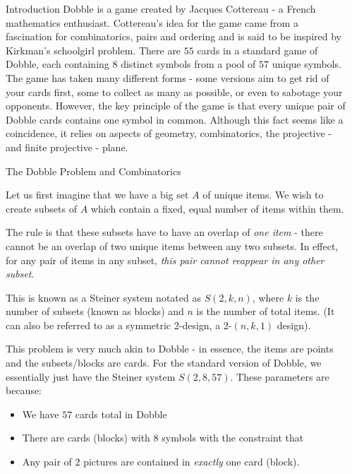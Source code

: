 \documentclass[final]{beamer}
\newlength{\sepwidth}
\newlength{\colwidth}
\newcommand{\separatorcolumn}{\begin{column}{\sepwidth}\end{column}}
\begin{document}
\begin{frame}[t]
\begin{columns}[t]
\separatorcolumn

\begin{column}{\colwidth}

  \begin{block}{Introduction}
    Dobble is a game created by Jacques Cottereau - a French mathematics enthusiast. Cottereau’s idea for the game came from a fascination for combinatorics, pairs and ordering and is said to be inspired by Kirkman’s schoolgirl problem. There are $55$ cards in a standard game of Dobble, each containing $8$ distinct symbols from a pool of $57$ unique symbols. The game has taken many different forms - some versions aim to get rid of your cards first, some to collect as many as possible, or even to sabotage your opponents. However, the key principle of the game is that every unique pair of Dobble cards contains one symbol in common. Although this fact seems like a coincidence, it relies on aspects of geometry, combinatorics, the projective - and finite projective - plane. 
  \end{block}

  \begin{alertblock}{The Dobble Problem and Combinatorics}

    Let us first imagine that we have a big set $A$ of unique items. We wish to create subsets of $A$ which contain a fixed, equal number of items within them.
    
    The rule is that these subsets have to have an overlap of \emph{one item} - there cannot be an overlap of two unique items between any two subsets. In effect, for any pair of items in any subset, \emph{this pair cannot reappear in any other subset}.

    This is known as a Steiner system notated as $S(2,k,n)$, where $k$ is the number of subsets (known as blocks) and $n$ is the number of total items. (It can also be referred to as a symmetric $2$-design, a $2$-$(n,k,1)$ design).

This problem is very much akin to Dobble - in essence, the items are points and the subsets/blocks are cards. For the standard version of Dobble, we essentially just have the Steiner system $S(2,8,57)$.
These parameters are because:
\begin{itemize}
    \item We have $57$ cards total in Dobble
    \item There are cards (blocks) with $8$ symbols with the constraint that
    \item Any pair of $2$ pictures are contained in \emph{exactly} one card (block).
\end{itemize}


\end{alertblock}
\end{column}
\end{columns}
\end{frame}
\end{document}
